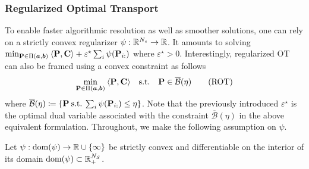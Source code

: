 \subsubsection{Regularized Optimal Transport}

To enable faster algorithmic resolution as well as smoother solutions, one can rely on a strictly convex regularizer $\psi : \mathbb{R}^{N_s} \to \mathbb{R}$. It amounts to solving $\min_{{\mathbf{P}} \in \Pi(\bm{a}, \bm{b})} \: \langle {\mathbf{P}}, \mathbf{C} \rangle + \varepsilon^\star \sum_i \psi({\mathbf{P}}_{i:})$ where $\varepsilon^\star > 0$. 
Interestingly, regularized OT can also be framed using a convex constraint as follows
\begin{align}\label{eq:cot}
    \min_{{\mathbf{P}} \in \Pi(\bm{a}, \bm{b})} \: \langle {\mathbf{P}}, {\mathbf{C}} \rangle \quad \text{s.t.} \quad  {\mathbf{P}} \in \overline{\mathcal{B}}(\eta)
    \tag{ROT}
\end{align}
where $\overline{\mathcal{B}}(\eta) \coloneqq \{ {\mathbf{P}} \: \text{s.t.} \: \sum_i \psi({\mathbf{P}}_{i:}) \leq \eta \}$. Note that the previously introduced $\varepsilon^\star$ is the optimal dual variable associated with the constraint $\overline{\mathcal{B}}(\eta)$ in the above equivalent formulation. 
Throughout, we make the following assumption on $\psi$.
\begin{assumption}\label{assumption_psi}
    Let $\psi: \mathrm{dom}(\psi) \to \mathbb{R} \cup \{\infty\}$ be strictly convex and differentiable on the interior of its domain $\mathrm{dom}(\psi) \subset \mathbb{R}^{N_S}_+$.
\end{assumption}

